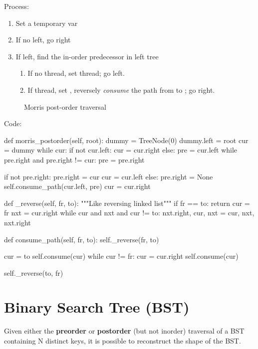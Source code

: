 Process:
\begin{enumerate}
\item Set a temporary var 
\item If no left, go right
\item If left, find the in-order predecessor  in left tree
\begin{enumerate}
\item If no thread, set  thread; go left.
\item If thread,  set , reversely \textit{consume} the path from  to ; go right.
\end{enumerate}
\end{enumerate}
\begin{figure*}[!htb]
\centering
{}
\caption{Morris post-order traversal}
\label{fig:morrisInorder}
\end{figure*}
Code:
\begin{python}
def morris_postorder(self, root):
    dummy = TreeNode(0)
    dummy.left = root
    cur = dummy
    while cur:
        if not cur.left:
            cur = cur.right
        else:
            pre = cur.left
            while pre.right and pre.right != cur:
                pre = pre.right

            if not pre.right:
                pre.right = cur
                cur = cur.left
            else:
                pre.right = None
                self.consume_path(cur.left, pre)
                cur = cur.right

def _reverse(self, fr, to):
    """Like reversing linked list"""
    if fr == to: return
    cur = fr
    nxt = cur.right
    while cur and nxt and cur != to:
        nxt.right, cur, nxt = cur, nxt, nxt.right

def consume_path(self, fr, to):
    self._reverse(fr, to)

    cur = to
    self.consume(cur)
    while cur != fr:
        cur = cur.right
        self.consume(cur)

    self._reverse(to, fr)
\end{python}

\section{Binary Search Tree (BST)}
Given either the \textbf{preorder} or \textbf{postorder} (but not inorder) traversal of a BST containing N distinct keys, it is possible to reconstruct the shape of the BST. 
